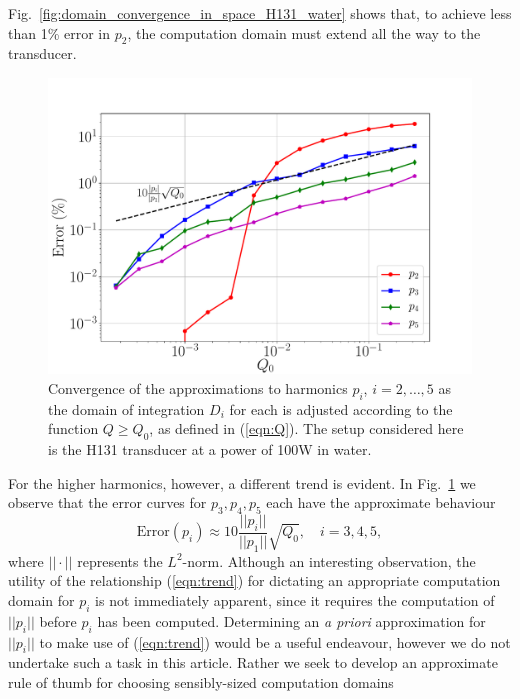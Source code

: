 \documentclass[preprint]{JASA}
\begin{document}
Fig.~\ref{fig:domain_convergence_in_space_H131_water} shows that, to achieve less than 1\% error
in $p_2$, the computation domain must extend all the way to the transducer. 
\begin{figure}[h!]
    \centering
    \includegraphics[width=\linewidth]{figures/domain_convergence_waterH131_power100.pdf}
    \caption{Convergence of the approximations to harmonics $p_i$, $i=2,\ldots,5$
    as the domain of integration $D_i$ for each is adjusted according to the 
    function $Q\geq Q_0$, as defined in (\ref{eqn:Q}). The setup considered here is the H131
    transducer at a power of 100W in water.}
    \label{fig:domain_convergence_H131_water}
\end{figure}
For the higher harmonics, however, a different trend is evident. In Fig.~\ref{fig:domain_convergence_H131_water}
we observe that the error curves for $p_3,p_4,p_5$ each have the approximate behaviour
\begin{equation}
    \text{Error}(p_i) \approx 10\frac{||p_i||}{||p_1||}\sqrt{Q_0},\quad i=3,4,5,
    \label{eqn:trend}
\end{equation}
where $||\cdot||$ represents the $L^2$-norm. Although an interesting observation, 
the utility of the relationship (\ref{eqn:trend}) for dictating an appropriate 
computation domain for $p_i$ is not immediately apparent, since it requires the 
computation of $||p_i||$ before $p_i$ has been computed. Determining an \emph{a priori} 
approximation for $||p_i||$ to make use of (\ref{eqn:trend}) would be a useful
endeavour, however we do not undertake such a task in this article. Rather we 
seek to develop an approximate rule of thumb for choosing sensibly-sized computation domains 
\end{document}
